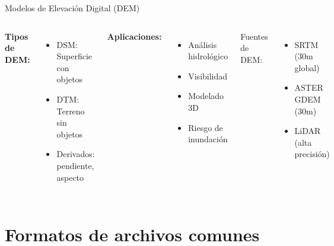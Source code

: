 \documentclass[10pt]{beamer}
\begin{document}
\begin{frame}{Modelos de Elevación Digital (DEM)}
    \begin{columns}
        \textbf{Tipos de DEM:}
        \begin{itemize}
            \item DSM: Superficie con objetos
            \item DTM: Terreno sin objetos
            \item Derivados: pendiente, aspecto
        \end{itemize}
        
        \textbf{Aplicaciones:}
        \begin{itemize}
            \item Análisis hidrológico
            \item Visibilidad
            \item Modelado 3D
            \item Riesgo de inundación
        \end{itemize}
        
        
        \vspace{0.5cm}
        \small
        Fuentes de DEM:
        \begin{itemize}
            \item SRTM (30m global)
            \item ASTER GDEM (30m)
            \item LiDAR (alta precisión)
        \end{itemize}
    \end{columns}
\end{frame}

\section{Formatos de archivos comunes}
\end{document}
